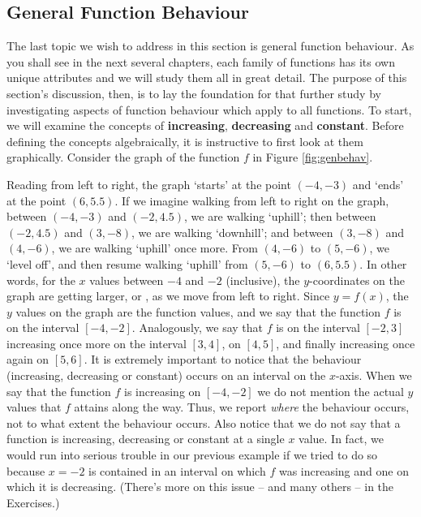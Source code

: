 \medskip

\subsection{General Function Behaviour}
\label{genfuncbehaviour}

The last topic we wish to address in this section is general function behaviour.  As you shall see in the next several chapters, each family of functions has its own unique attributes and we will study them all in great detail.  The purpose of this section's discussion, then, is to lay the foundation for that further study by investigating aspects of function behaviour which apply to all functions.  To start, we will examine the concepts of  {\bf increasing},  {\bf decreasing} and  {\bf constant}.  Before defining the concepts algebraically, it is instructive to first look at them graphically.  Consider the graph of the function $f$ in Figure \ref{fig:genbehav}.

Reading from left to right, the graph `starts' at the point $(-4,-3)$ and `ends' at the point $(6,5.5)$.  If we imagine walking from left to right on the graph, between $(-4,-3)$ and $(-2,4.5)$, we are walking `uphill'; then between $(-2,4.5)$ and $(3,-8)$, we are walking `downhill'; and between $(3,-8)$ and $(4,-6)$, we are walking `uphill' once more.  From $(4,-6)$ to $(5, -6)$, we `level off', and then resume walking `uphill' from $(5,-6)$ to $(6,5.5)$.  In other words, for the $x$ values between $-4$ and $-2$ (inclusive), the $y$-coordinates on the graph are getting larger, or  , as we move from left to right.  Since $y = f(x)$, the $y$ values on the graph are the function values, and we say that the function $f$ is  on the interval $[-4,-2]$.  Analogously, we say that $f$ is   on the interval $[-2,3]$ increasing once more on the interval $[3,4]$,   on $[4,5]$, and finally increasing once again on $[5,6]$.  It is extremely important to notice that the behaviour (increasing, decreasing or constant) occurs on an interval on the $x$-axis.  When we say that the function $f$ is increasing on $[-4, -2]$ we do not mention the actual $y$ values that $f$ attains along the way.  Thus, we report \emph{where} the behaviour occurs, not to what extent the behaviour occurs. Also notice that we do not say that a function is increasing, decreasing or constant at a single $x$ value.  In fact, we would run into serious trouble in our previous example if we tried to do so because $x = -2$ is contained in an interval on which $f$ was increasing and one on which it is decreasing.  (There's more on this issue -- and many others -- in the Exercises.) 

